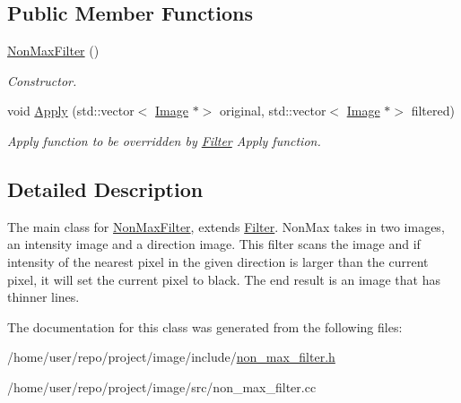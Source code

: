 \subsection*{Public Member Functions}
\begin{DoxyCompactItemize}
\item 
\mbox{\label{classNonMaxFilter_a808e6673c7af061a63a9bc00ba11b122}} 
\hyperlink{classNonMaxFilter_a808e6673c7af061a63a9bc00ba11b122}{Non\+Max\+Filter} ()
\begin{DoxyCompactList}\small\item\em Constructor. \end{DoxyCompactList}\item 
\mbox{\label{classNonMaxFilter_ac9ba4522e1b91ff1d5cf3143aec2079f}} 
void \hyperlink{classNonMaxFilter_ac9ba4522e1b91ff1d5cf3143aec2079f}{Apply} (std\+::vector$<$ \hyperlink{classImage}{Image} $\ast$$>$ original, std\+::vector$<$ \hyperlink{classImage}{Image} $\ast$$>$ filtered)
\begin{DoxyCompactList}\small\item\em Apply function to be overridden by \hyperlink{classFilter}{Filter} Apply function. \end{DoxyCompactList}\end{DoxyCompactItemize}


\subsection{Detailed Description}
The main class for \hyperlink{classNonMaxFilter}{Non\+Max\+Filter}, extends \hyperlink{classFilter}{Filter}. Non\+Max takes in two images, an intensity image and a direction image. This filter scans the image and if intensity of the nearest pixel in the given direction is larger than the current pixel, it will set the current pixel to black. The end result is an image that has thinner lines. 

The documentation for this class was generated from the following files\+:\begin{DoxyCompactItemize}
\item 
/home/user/repo/project/image/include/\hyperlink{non__max__filter_8h}{non\+\_\+max\+\_\+filter.\+h}\item 
/home/user/repo/project/image/src/non\+\_\+max\+\_\+filter.\+cc\end{DoxyCompactItemize}
